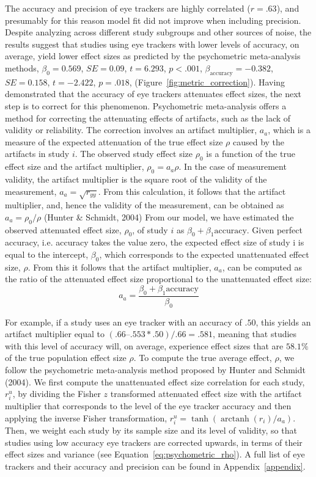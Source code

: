 \documentclass{article}
\newcommand{\SE}{\mathit{SE}}
\DeclareMathOperator\arctanh{arctanh}
\begin{document}
The accuracy and precision of eye trackers are highly correlated ($r = .63$), and presumably for this reason model fit did not improve when including precision. Despite analyzing across different study subgroups and other sources of noise, the results suggest that studies using eye trackers with lower levels of accuracy, on average, yield lower effect sizes as predicted by the psychometric meta-analysis methods, $\beta_0 = 0.569$, $\SE = 0.09$, $t = 6.293$, $p < .001$, $\beta_{\textrm{accuracy}} = -0.382$, $\SE = 0.158$, $t = -2.422$, $p = .018$, (Figure~\ref{fig:metric_correction}). Having demonstrated that the accuracy of eye trackers attenuates effect sizes, the next step is to correct for this phenomenon. Psychometric meta-analysis offers a method for correcting the attenuating effects of artifacts, such as the lack of validity or reliability. The correction involves an artifact multiplier, $a_a$, which is a measure of the expected attenuation of the true effect size $\rho$ caused by the artifacts in study $i$. The observed study effect size $\rho_0$ is a function of the true effect size and the artifact multiplier, $\rho_0 = a_a \rho$. In the case of measurement validity, the artifact multiplier is the square root of the validity of the measurement, $a_a = \sqrt{r_{yy}}$. From this calculation, it follows that the artifact multiplier, and, hence the validity of the measurement, can be obtained as $a_a = \rho_0 / \rho$ (Hunter \& Schmidt, 2004) From our model, we have estimated the observed attenuated effect size, $\rho_0$, of study $i$ as $\beta_0 + \beta_1 \textrm{accuracy}$. Given perfect accuracy, i.e. accuracy takes the value zero, the expected effect size of study i is equal to the intercept, $\beta_0$, which corresponds to the expected unattenuated effect size, $\rho$. From this it follows that the artifact multiplier, $a_a$, can be computed as the ratio of the attenuated effect size proportional to the unattenuated effect size:
%
\begin{equation}
\label{eq:artifact_multiplier}
a_a = \frac{\beta_0 + \beta_1 \textrm{accuracy}}{\beta_0}
\end{equation}

For example, if a study uses an eye tracker with an accuracy of $.50$, this yields an artifact multiplier equal to $(.66 – .553*.50)/.66 = .581$, meaning that studies with this level of accuracy will, on average, experience effect sizes that are $58.1\%$ of the true population effect size $\rho$. To compute the true average effect, $\rho$, we follow the psychometric meta-analysis method proposed by Hunter and Schmidt (2004). We first compute the unattenuated effect size correlation for each study, $r_i^u$, by dividing the Fisher $z$ transformed attenuated effect size with the artifact multiplier that corresponds to the level of the eye tracker accuracy and then applying the inverse Fisher transformation, $r_i^u = \tanh(\arctanh(r_i)/a_a)$. Then, we weight each study by its sample size and its level of validity, so that studies using low accuracy eye trackers are corrected upwards, in terms of their effect sizes and variance (see Equation~\ref{eq:psychometric_rho}). A full list of eye trackers and their accuracy and precision can be found in Appendix~\ref{appendix}.
\end{document}
